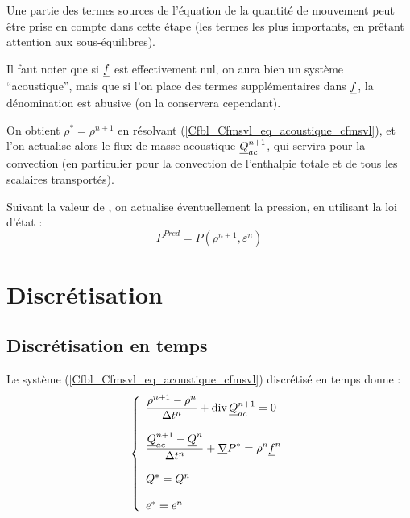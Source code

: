 Une partie des termes sources de l'\'equation de la
quantit\'e de mouvement peut \^etre prise en compte dans cette \'etape
(les termes les plus importants, en pr\^etant attention aux sous-\'equilibres).

Il faut noter que si $\underline{f}$ est effectivement nul, on aura bien un
syst\`eme ``acoustique'', mais que si l'on place des termes suppl\'ementaires
dans $\underline{f}$, la d\'enomination est abusive (on la conservera cependant).

On obtient $\rho^* = \rho^{n+1}$ en r\'esolvant (\ref{Cfbl_Cfmsvl_eq_acoustique_cfmsvl}),
et l'on actualise alors le flux de masse acoustique $\underline{Q}_{ac}^{n+1}$,
qui servira pour la convection (en particulier pour la convection de
l'enthalpie totale et de tous les scalaires transport\'es).

Suivant la valeur de , on actualise éventuellement la pression, en
utilisant la loi d'\'etat :
$$
\displaystyle P^{Pred}=P(\rho^{n+1},\varepsilon^{n})
$$

\section*{Discr\'etisation}
\subsection*{Discr\'etisation en temps}

Le syst\`eme (\ref{Cfbl_Cfmsvl_eq_acoustique_cfmsvl}) discr\'etis\'e en temps donne :
\begin{equation}\label{Cfbl_Cfmsvl_eq_acoustique_discrete_cfmsvl}
\left\{\begin{array}{l}

\displaystyle\frac{\rho^{n+1}-\rho^n}{\Delta t^n}
+ \text{div}\,{\underline{Q}_{ac}^{n+1}} = 0 \\
\\
\displaystyle\frac{\underline{Q}_{ac}^{n+1}-\underline{Q}^n}{\Delta t^n}+\underline{\nabla}{P^*} =
\rho^n \underline{f}^n\\
\\
Q^*=Q^n\\
\\
e^*=e^n\\

\end{array}\right.
\end{equation}

